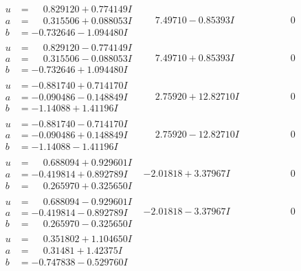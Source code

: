 \documentclass[1p]{elsarticle_modified}
\theoremstyle{definition}
\begin{document}
$$\begin{array}{c|c|c}
\begin{aligned}
u &= \phantom{-}0.829120 + 0.774149 I \\
a &= \phantom{-}0.315506 + 0.088053 I \\
b &= -0.732646 - 1.094480 I\end{aligned}
 & \phantom{-}7.49710 - 0.85393 I & \phantom{-0.000000 } 0 \\ \hline\begin{aligned}
u &= \phantom{-}0.829120 - 0.774149 I \\
a &= \phantom{-}0.315506 - 0.088053 I \\
b &= -0.732646 + 1.094480 I\end{aligned}
 & \phantom{-}7.49710 + 0.85393 I & \phantom{-0.000000 } 0 \\ \hline\begin{aligned}
u &= -0.881740 + 0.714170 I \\
a &= -0.090486 - 0.148849 I \\
b &= -1.14088 + 1.41196 I\end{aligned}
 & \phantom{-}2.75920 + 12.82710 I & \phantom{-0.000000 } 0 \\ \hline\begin{aligned}
u &= -0.881740 - 0.714170 I \\
a &= -0.090486 + 0.148849 I \\
b &= -1.14088 - 1.41196 I\end{aligned}
 & \phantom{-}2.75920 - 12.82710 I & \phantom{-0.000000 } 0 \\ \hline\begin{aligned}
u &= \phantom{-}0.688094 + 0.929601 I \\
a &= -0.419814 + 0.892789 I \\
b &= \phantom{-}0.265970 + 0.325650 I\end{aligned}
 & -2.01818 + 3.37967 I & \phantom{-0.000000 } 0 \\ \hline\begin{aligned}
u &= \phantom{-}0.688094 - 0.929601 I \\
a &= -0.419814 - 0.892789 I \\
b &= \phantom{-}0.265970 - 0.325650 I\end{aligned}
 & -2.01818 - 3.37967 I & \phantom{-0.000000 } 0 \\ \hline\begin{aligned}
u &= \phantom{-}0.351802 + 1.104650 I \\
a &= \phantom{-}0.31481 + 1.42375 I \\
b &= -0.747838 - 0.529760 I\end{aligned}

\end{array}$$
\end{document}

